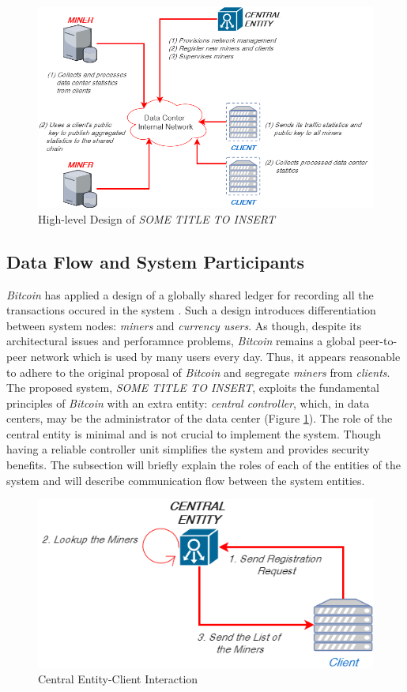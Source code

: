 \documentclass{article}
\newcommand{\projTitle}{SOME TITLE TO INSERT}
\begin{document}
\begin{figure}[h!]
  \begin{center}
    \includegraphics[width=0.8\linewidth]{figures/project_design.png}
    \caption{High-level Design of \textit{\projTitle}}
    \label{fig:project_design}
  \end{center}
\end{figure}


\subsection{Data Flow and System Participants} \label{ssec:system_design_and_flow}
 \textit{Bitcoin} has applied a design of a globally shared ledger for recording all the transactions occured in the system \cite{bitcoin_paper}. Such a design introduces differentiation between system nodes: \textit{miners} and \textit{currency users}. As though, despite its architectural issues and perforamnce problems, \textit{Bitcoin} remains a global peer-to-peer network which is used by many users every day. Thus, it appears reasonable to adhere to the original proposal of \textit{Bitcoin} and segregate \textit{miners} from \textit{clients}. The proposed system, \textit{\projTitle}, exploits the fundamental principles of \textit{Bitcoin} with an extra entity: \textit{central controller}, which, in data centers, may be the administrator of the data center (Figure \ref{fig:project_design}). The role of the central entity is minimal and is not crucial to implement the system. Though having a reliable controller unit simplifies the system and provides security benefits. The subsection will briefly explain the roles of each of the entities of the system and will describe communication flow between the system entities.


\begin{figure}[h]
  \begin{center}
    \includegraphics[width=0.6\linewidth]{figures/central_entity_client_reg.png}
    \caption{Central Entity-Client Interaction}
    \label{fig:central_entity_client_reg}
  \end{center}
\end{figure}   
\end{document}
